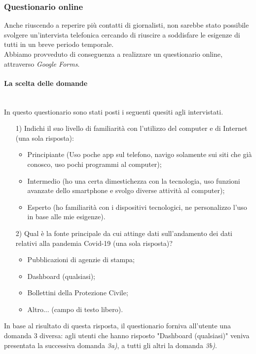 \subsubsection{Questionario online}
Anche riuscendo a reperire più contatti di giornalisti, non sarebbe stato possibile svolgere un'intervista telefonica cercando di riuscire a soddisfare le esigenze di tutti in un breve periodo temporale.\\
Abbiamo provveduto di conseguenza a realizzare un questionario online, attraverso \textit{Google Forms}.

\paragraph{La scelta delle domande}\mbox{}\\
In questo questionario sono stati posti i seguenti quesiti agli intervistati.
\begin{itemize}
    \item[1)] Indichi il suo livello di familiarità con l'utilizzo del computer e di Internet (una sola risposta):
    \begin{itemize}
        \item Principiante (Uso poche app sul telefono, navigo solamente sui siti che già conosco, uso pochi programmi al computer);
        \item Intermedio (ho una certa dimestichezza con la tecnologia, uso funzioni avanzate dello smartphone e svolgo diverse attività al computer);
        \item Esperto (ho familiarità con i dispositivi tecnologici, ne personalizzo l'uso in base alle mie esigenze).
    \end{itemize}
    \item[2)] Qual è la fonte principale da cui attinge dati sull'andamento dei dati relativi alla pandemia Covid-19 (una sola risposta)?
    \begin{itemize}
        \item Pubblicazioni di agenzie di stampa;
        \item Dashboard (qualsiasi);
        \item Bollettini della Protezione Civile;
        \item Altro... (campo di testo libero).
    \end{itemize}
\end{itemize}
In base al risultato di questa risposta, il questionario forniva all'utente una domanda 3 diversa: agli utenti che hanno risposto "Dashboard (qualsiasi)" veniva presentata la successiva domanda \textit{3a)}, a tutti gli altri la domanda \textit{3b)}.
